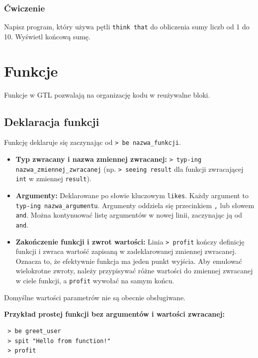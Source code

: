 \documentclass[12pt,a4paper]{article}
\begin{document}
\subsubsection*{Ćwiczenie}
Napisz program, który używa pętli \texttt{think that} do obliczenia sumy liczb od 1 do 10. Wyświetl końcową sumę.

\newpage
\section{Funkcje}
\label{sec:functions}
Funkcje w GTL pozwalają na organizację kodu w reużywalne bloki.

\subsection{Deklaracja funkcji}
Funkcję deklaruje się zaczynając od \texttt{> be {nazwa\_funkcji}}.
\begin{itemize}
    \item \textbf{Typ zwracany i nazwa zmiennej zwracanej:} \texttt{> {typ}-ing {nazwa\_zmiennej\_zwracanej}} (np. \texttt{> seeing result} dla funkcji zwracającej \texttt{int} w zmiennej \texttt{result}).
    \item \textbf{Argumenty:} Deklarowane po słowie kluczowym \texttt{likes}. Każdy argument to \texttt{{typ}-ing {nazwa\_argumentu}}. Argumenty oddziela się przecinkiem \texttt{,} lub słowem \texttt{and}. Można kontynuować listę argumentów w nowej linii, zaczynając ją od \texttt{and}.
    \item \textbf{Zakończenie funkcji i zwrot wartości:} Linia \texttt{> profit} kończy definicję funkcji i zwraca wartość zapisaną w zadeklarowanej zmiennej zwracanej. Oznacza to, że efektywnie funkcja ma jeden punkt wyjścia. Aby emulować wielokrotne zwroty, należy przypisywać różne wartości do zmiennej zwracanej w ciele funkcji, a \texttt{profit} wywołać na samym końcu.
\end{itemize}
Domyślne wartości parametrów nie są obecnie obsługiwane.

\textbf{Przykład prostej funkcji bez argumentów i wartości zwracanej:}
\begin{lstlisting}
 > be greet_user
 > spit "Hello from function!"
 > profit
\end{lstlisting}
\end{document}
